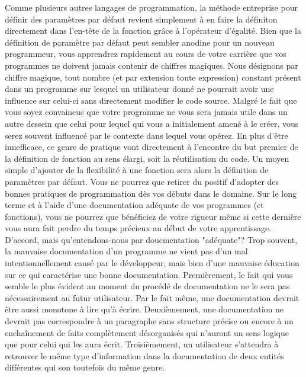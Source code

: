 \vspace{\baselineskip}
\noindent
Comme plusieurs autres langages de programmation, la méthode entreprise pour définir des paramètres par défaut revient simplement à en faire la définiton directement dans l'en-tête de la fonction grâce à l'opérateur d'égalité. Bien que la définition de paramètre par défaut peut sembler anodine pour un nouveau programmeur, vous apprendrez rapidement au cours de votre carrière que vos programmes ne doivent jamais contenir de chiffres magiques. Nous désignons par chiffre magique, tout nombre (et par extension toute expression) constant présent dans un programme sur lesquel un utilisateur donné ne pourrait avoir une influence sur celui-ci sans directement modifier le code source. Malgré le fait que vous soyez convaincus que votre programme ne vous sera jamais utile dans un autre dessein que celui pour lequel qui vous a initialement amené à le créer, vous serez souvent influencé par le contexte dans lequel vous opérez. En plus d'être innefficace, ce genre de pratique vont directement à l'encontre du but premier de la définition de fonction au sens élargi, soit la réutilisation du code. Un moyen simple d'ajouter de la flexibilité à une fonction sera alors la définition de paramètres par défaut. Vous ne pourrez que retirer du positif d'adopter des bonnes pratiques de programmation dès vos débuts dans le domaine. Sur le long terme et à l'aide d'une documentation adéquate de vos programmes (et fonctions), vous ne pourrez que bénéficiez de votre rigueur même si cette dernière vous aura fait perdre du temps précieux au début de votre apprentissage. \\

\noindent
D'accord, mais qu'entendons-nous par doucmentation "adéquate"? Trop souvent, la mauvaise documentation d'un programme ne vient pas d'un mal intentionnellement causé par le développeur, mais bien d'une mauvaise éducation sur ce qui caractérise une bonne documentation. Premièrement, le fait qui vous semble le plus évident au moment du procédé de documentation ne le sera pas nécessairement au futur utilisateur.  Par le fait même, une documentation devrait être aussi monotone à lire qu'à écrire. Deuxièmement, une documentation ne devrait pas correspondre à un paragraphe sans structure précise ou encore à un enchaînement de faits complètement désorganisés qui n'auront un sens logique que pour celui qui les aura écrit. Troisièmement, un utilisateur s'attendra à retrouver le même type d'information dans la documentation de deux entités différentes qui son toutefois du même genre. \\

